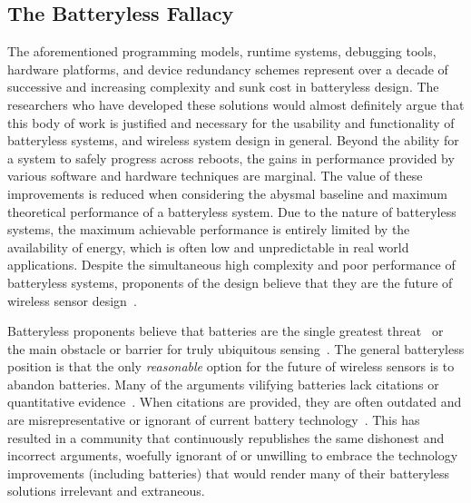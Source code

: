\subsection{The Batteryless Fallacy}
The aforementioned programming models, runtime systems, debugging tools, hardware platforms, and device redundancy schemes represent over a decade of successive and increasing complexity and sunk cost in batteryless design. 
The researchers who have developed these solutions would almost definitely argue that this body of work is justified and necessary for the usability and functionality of batteryless systems, and wireless system design in general.
Beyond the ability for a system to safely progress across reboots, the gains in performance provided by various software and hardware techniques are marginal. 
The value of these improvements is reduced when considering the abysmal baseline and maximum theoretical performance of a batteryless system.
Due to the nature of batteryless systems, the maximum achievable performance is entirely limited by the availability of energy, which is often low and unpredictable in real world applications. 
Despite the simultaneous high complexity and poor performance of batteryless systems, proponents of the design believe that they are the future of wireless sensor design~\cite{hester2017future}.

Batteryless proponents believe that batteries are the single greatest threat~\cite{hester2017future} or the main obstacle or barrier for truly ubiquitous sensing~\cite{majid2020continuous, shukla2019skinnypower}.
The general batteryless position is that the only \textit{reasonable} option for the future of wireless sensors is to abandon batteries. 
Many of the arguments vilifying batteries lack citations or quantitative evidence~\cite{hester2017future, hesterTragedy15, hesterFlicker17, hesterTimely17, hester2017future, colinReconfigurable18, luciaIntermittent17, yervaGrafting12, majid2020continuous}. When citations are provided, they are often outdated and are misrepresentative or ignorant of current battery technology~\cite{majid2020continuous}. 
This has resulted in a community that continuously republishes the same dishonest and incorrect arguments, 
woefully ignorant of or unwilling to embrace the technology improvements (including batteries) that would render many of their batteryless solutions irrelevant and extraneous.

